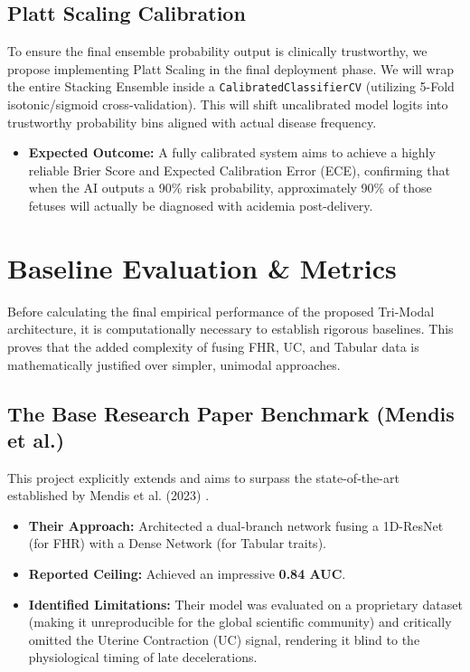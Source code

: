 \documentclass[12pt,a4paper]{report}
\begin{document}
\section{Platt Scaling Calibration}
To ensure the final ensemble probability output is clinically trustworthy, we propose implementing Platt Scaling \cite{platt} in the final deployment phase. We will wrap the entire Stacking Ensemble inside a \texttt{CalibratedClassifierCV} (utilizing 5-Fold isotonic/sigmoid cross-validation). This will shift uncalibrated model logits into trustworthy probability bins aligned with actual disease frequency.
\begin{itemize}
    \item \textbf{Expected Outcome:} A fully calibrated system aims to achieve a highly reliable Brier Score and Expected Calibration Error (ECE), confirming that when the AI outputs a 90\% risk probability, approximately 90\% of those fetuses will actually be diagnosed with acidemia post-delivery.
\end{itemize}


\chapter{Baseline Evaluation \& Metrics}
Before calculating the final empirical performance of the proposed Tri-Modal architecture, it is computationally necessary to establish rigorous baselines. This proves that the added complexity of fusing FHR, UC, and Tabular data is mathematically justified over simpler, unimodal approaches.

\section{The Base Research Paper Benchmark (Mendis et al.)}
This project explicitly extends and aims to surpass the state-of-the-art established by Mendis et al. (2023) \cite{mendis}. 
\begin{itemize}
    \item \textbf{Their Approach:} Architected a dual-branch network fusing a 1D-ResNet (for FHR) with a Dense Network (for Tabular traits).
    \item \textbf{Reported Ceiling:} Achieved an impressive \textbf{0.84 AUC}.
    \item \textbf{Identified Limitations:} Their model was evaluated on a proprietary dataset (making it unreproducible for the global scientific community) and critically omitted the Uterine Contraction (UC) signal, rendering it blind to the physiological timing of late decelerations.
\end{itemize}
\end{document}
